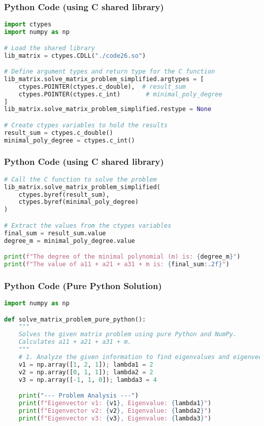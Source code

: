 \documentclass{beamer}
\begin{document}
\begin{frame}[fragile]
\frametitle{Python Code (using C shared library)}
\begin{lstlisting}[language=Python]
import ctypes
import numpy as np

# Load the shared library
lib_matrix = ctypes.CDLL("./code26.so")

# Define argument types and return type for the C function
lib_matrix.solve_matrix_problem_simplified.argtypes = [
    ctypes.POINTER(ctypes.c_double),  # result_sum
    ctypes.POINTER(ctypes.c_int)       # minimal_poly_degree
]
lib_matrix.solve_matrix_problem_simplified.restype = None

# Create ctypes variables to hold the results
result_sum = ctypes.c_double()
minimal_poly_degree = ctypes.c_int()
\end{lstlisting}
\end{frame}

\begin{frame}[fragile]
\frametitle{Python Code (using C shared library)}
\begin{lstlisting}[language=Python]
# Call the C function to solve the problem
lib_matrix.solve_matrix_problem_simplified(
    ctypes.byref(result_sum),
    ctypes.byref(minimal_poly_degree)
)

# Extract the values from the ctypes variables
final_sum = result_sum.value
degree_m = minimal_poly_degree.value

print(f"The degree of the minimal polynomial (m) is: {degree_m}")
print(f"The value of a11 + a21 + a31 + m is: {final_sum:.2f}")
\end{lstlisting}
\end{frame}

\begin{frame}[fragile]
\frametitle{Python Code (Pure Python Solution)}
\begin{lstlisting}[language=Python]
import numpy as np

def solve_matrix_problem_pure_python():
    """
    Solves the given matrix problem using pure Python and NumPy.
    Calculates a11 + a21 + a31 + m.
    """
    # 1. Analyze the given information to find eigenvalues and eigenvectors
    v1 = np.array([1, 2, 1]); lambda1 = 2
    v2 = np.array([0, 1, 1]); lambda2 = 2
    v3 = np.array([-1, 1, 0]); lambda3 = 4

    print("--- Problem Analysis ---")
    print(f"Eigenvector v1: {v1}, Eigenvalue: {lambda1}")
    print(f"Eigenvector v2: {v2}, Eigenvalue: {lambda2}")
    print(f"Eigenvector v3: {v3}, Eigenvalue: {lambda3}")
\end{lstlisting}
\end{frame}
\end{document}
